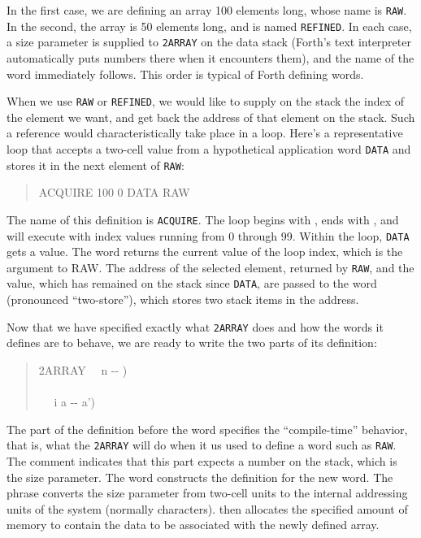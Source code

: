 In the first case, we are defining an array 100 elements long, whose
name is \texttt{RAW}. In the second, the array is 50 elements long,
and is named \texttt{REFINED}. In each case, a size parameter is
supplied to \texttt{2ARRAY} on the data stack (Forth's text
interpreter automatically puts numbers there when it encounters
them), and the name of the word immediately follows. This order is
typical of Forth defining words.

When we use \texttt{RAW} or \texttt{REFINED}, we would like to
supply on the stack the index of the element we want, and get back
the address of that element on the stack. Such a reference would
characteristically take place in a loop. Here's a representative
loop that accepts a two-cell value from a hypothetical application
word \texttt{DATA} and stores it in the next element of \texttt{RAW}:

\begin{quote}\ttfamily
	\word{:} ACQUIRE
		100 0 
			DATA  RAW 
	\word{;}
\end{quote}

The name of this definition is \texttt{ACQUIRE}. The loop begins with
, ends with , and will execute with index values
running from 0 through 99. Within the loop, \texttt{DATA} gets a value.
The word  returns the current value of the loop index, which
is the argument to RAW. The address of the selected element, returned
by \texttt{RAW}, and the value, which has remained on the stack since
\texttt{DATA}, are passed to the word  (pronounced
``two-store''), which stores two stack items in the address.

Now that we have specified exactly what \texttt{2ARRAY} does and how
the words it defines are to behave, we are ready to write the two
parts of its definition:

\begin{quote}\ttfamily
	\word{:} 2ARRAY~~ n -{}- ) \\
	\tab {} ~    \\
	\tab {} ~~  i a -{}- a') ~
		 ~   \word{+} ~
	\word{;}
\end{quote}

The part of the definition before the word  specifies the
``compile-time'' behavior, that is, what the \texttt{2ARRAY} will do
when it us used to define a word such as \texttt{RAW}. The comment
indicates that this part expects a number on the stack, which is the
size parameter. The word  constructs the definition for
the new word. The phrase   converts the size
parameter from two-cell units to the internal addressing units of the
system (normally characters).  then allocates the specified
amount of memory to contain the data to be associated with the newly
defined array.

